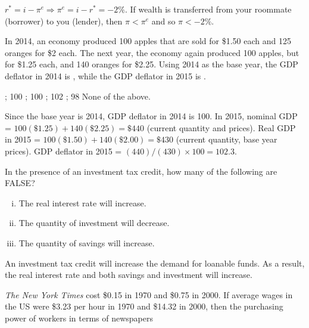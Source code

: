 \documentclass[addpoints,11pt]{exam}
\theoremstyle{definition}
\newcommand{\blank}[0]{\underline{\hspace{3cm}}}
\begin{document}
\begin{questions}
		\begin{solution}
			 $r^* = i - \pi^e \Rightarrow \pi^e = i - r^* = -2\%$. If wealth is transferred from your roommate (borrower) to you (lender), then $\pi < \pi^e$ and so $\pi < -2\%$.
		\end{solution}
	
	
	\question In 2014, an economy produced 100 apples that are sold for \$1.50 each and 125 oranges for \$2 each. The next year, the economy again produced 100 apples, but for \$1.25 each, and 140 oranges for \$2.25. Using 2014 as the base year, the GDP deflator in 2014 is \blank, while the GDP deflator in 2015 is \blank.
	
	\begin{choices}
		; 100
		; 100
		; 102
		; 98
		\choice None of the above.
	\end{choices}
	
	\begin{solution} 
		Since the base year is 2014, GDP deflator in 2014 is 100. In 2015, nominal GDP = $100(\$1.25) + 140(\$2.25) = \$440$ (current quantity and prices). Real GDP in 2015 = $100(\$1.50) + 140(\$2.00) = \$430$ (current quantity, base year prices). GDP deflator in 2015 = $(440)/(430)\times 100 = 102.3$.
	\end{solution}	
	

	
	
	\question In the presence of an investment tax credit, how many of the following are FALSE?
	
		\begin{enumerate}[(i)]
			\item The real interest rate will increase.
			\item The quantity of investment will decrease.
			\item The quantity of savings will increase.
		\end{enumerate}
		
		\begin{choices}
			\choice 0
			\CorrectChoice 1
			\choice 2
			\choice 3
		\end{choices}	
	
	\begin{solution} 
		An investment tax credit will increase the demand for loanable funds. As a result, the real interest rate and both savings and investment will increase.
	\end{solution}

	
	\question \textit{The New York Times} cost \$0.15 in 1970 and \$0.75 in 2000. If average wages in the US were \$3.23 per hour in 1970 and \$14.32 in 2000, then the purchasing power of workers in terms of newspapers 
	

\end{questions}
\end{document}
